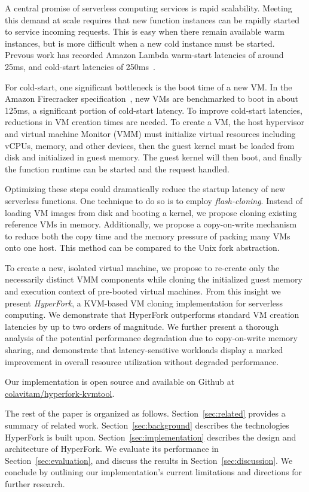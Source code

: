  A central promise of serverless computing
services is rapid scalability. Meeting this demand at scale requires that new
function instances can be rapidly started to service incoming requests. This is
easy when there remain available warm instances, but is more difficult when a
new cold instance must be started. Prevous work has recorded Amazon Lambda
warm-start latencies of around 25ms, and cold-start latencies of
250ms~\cite{peeking}.

For cold-start, one significant bottleneck is the boot time of a new VM. In the
Amazon Firecracker specification~\cite{firecracker-spec}, new VMs are
benchmarked to boot in about 125ms, a significant portion of cold-start
latency. To improve cold-start latencies, reductions in VM creation times are
needed. To create a VM, the host hypervisor and virtual machine Monitor (VMM)
must initialize virtual resources including vCPUs, memory, and other devices,
then the guest kernel must be loaded from disk and initialized in guest memory.
The guest kernel will then boot, and finally the function runtime can be
started and the request handled.

 Optimizing these steps could dramatically
reduce the startup latency of new serverless functions. One technique to do so
is to employ \emph{flash-cloning}. Instead of loading VM images from disk and
booting a kernel, we propose cloning existing reference VMs in memory.
Additionally, we propose a copy-on-write mechanism to reduce both the copy time
and the memory pressure of packing many VMs onto one host. This method can be
compared to the Unix fork abstraction.

 To create a new, isolated virtual machine, we propose to
re-create only the necessarily distinct VMM components while cloning the
initialized guest memory and execution context of pre-booted virtual machines.
From this insight we present \emph{HyperFork}, a KVM-based VM cloning
implementation for serverless computing. We demonstrate that HyperFork
outperforms standard VM creation latencies by up to two orders of magnitude. We
further present a thorough analysis of the potential performance degradation due
to copy-on-write memory sharing, and demonstrate that latency-sensitive
workloads display a marked improvement in overall resource utilization without
degraded performance.

Our implementation is open source and available on Github at
\href{https://github.com/colavitam/hyperfork-kvmtool}{colavitam/hyperfork-kvmtool}.

The rest of the paper is organized as follows. Section~\ref{sec:related}
provides a summary of related work. Section~\ref{sec:background} describes the
technologies HyperFork is built upon. Section~\ref{sec:implementation}
describes the design and architecture of HyperFork. We evaluate its performance
in Section~\ref{sec:evaluation}, and discuss the results in
Section~\ref{sec:discussion}. We conclude by outlining our implementation's
current limitations and directions for further research.
